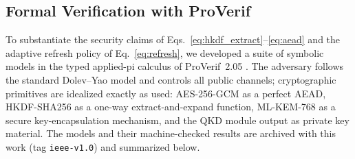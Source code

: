 \documentclass[journal]{IEEEtran}
\begin{document}
\subsection{Formal Verification with ProVerif}
\label{sec:proverif}

To substantiate the security claims of Eqs.~\eqref{eq:hkdf_extract}--\eqref{eq:aead} and
the adaptive refresh policy of Eq.~\eqref{eq:refresh}, we developed a suite of symbolic
models in the typed applied-pi calculus of ProVerif~2.05 \cite{blanchet2016proverif}. The
adversary follows the standard Dolev--Yao model and controls all public channels;
cryptographic primitives are idealized exactly as used: AES-256-GCM as a perfect AEAD,
HKDF-SHA256 as a one-way extract-and-expand function, ML-KEM-768 as a secure
key-encapsulation mechanism, and the QKD module output as private key material. The
models and their machine-checked results are archived with this work (tag
\texttt{ieee-v1.0}) and summarized below.
\end{document}
